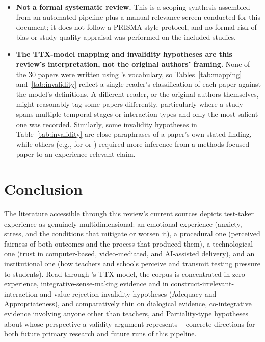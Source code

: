 \documentclass[11pt]{article}
\begin{document}
\begin{itemize}[leftmargin=*]
    \item \textbf{Not a formal systematic review.} This is a scoping synthesis assembled from an automated pipeline plus a manual relevance screen conducted for this document; it does not follow a PRISMA-style protocol, and no formal risk-of-bias or study-quality appraisal was performed on the included studies.
    \item \textbf{The TTX-model mapping and invalidity hypotheses are this review's interpretation, not the original authors' framing.} None of the 30 papers were written using \citeauthor{araneda2025ttxmodel}'s vocabulary, so Tables~\ref{tab:mapping} and~\ref{tab:invalidity} reflect a single reader's classification of each paper against the model's definitions. A different reader, or the original authors themselves, might reasonably tag some papers differently, particularly where a study spans multiple temporal stages or interaction types and only the most salient one was recorded. Similarly, some invalidity hypotheses in Table~\ref{tab:invalidity} are close paraphrases of a paper's own stated finding, while others (e.g., for \citet{grand2013sensitivity} or \citet{suk2026unfairness}) required more inference from a methods-focused paper to an experience-relevant claim.
\end{itemize}

\section{Conclusion}

The literature accessible through this review's current sources depicts test-taker experience as genuinely multidimensional: an emotional experience (anxiety, stress, and the conditions that mitigate or worsen it), a procedural one (perceived fairness of both outcomes and the process that produced them), a technological one (trust in computer-based, video-mediated, and AI-assisted delivery), and an institutional one (how teachers and schools perceive and transmit testing pressure to students). Read through \citeauthor{araneda2025ttxmodel}'s TTX model, the corpus is concentrated in zero-experience, integrative-sense-making evidence and in construct-irrelevant-interaction and value-rejection invalidity hypotheses (Adequacy and Appropriateness), and comparatively thin on dialogical evidence, co-integrative evidence involving anyone other than teachers, and Partiality-type hypotheses about whose perspective a validity argument represents -- concrete directions for both future primary research and future runs of this pipeline.
\end{document}
